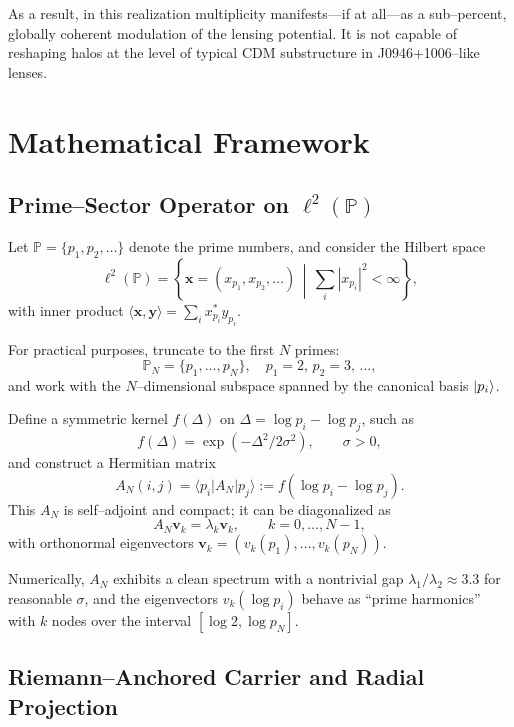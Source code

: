 \documentclass[11pt]{article}
\begin{document}
As a result, in this realization multiplicity manifests---if at all---as a sub--percent, globally coherent modulation of the lensing potential. It is not capable of reshaping halos at the level of typical CDM substructure in J0946+1006--like lenses.

\section{Mathematical Framework}

\subsection{Prime--Sector Operator on $\ell^2(\mathbb{P})$}

Let $\mathbb{P} = \{p_1, p_2, \dots\}$ denote the prime numbers, and consider the Hilbert space
\[
\ell^2(\mathbb{P}) = \left\{ \bm{x} = (x_{p_1}, x_{p_2}, \dots) \,\middle|\, \sum_{i} |x_{p_i}|^2 < \infty \right\},
\]
with inner product $\langle \bm{x}, \bm{y} \rangle = \sum_i x_{p_i}^* y_{p_i}$.

For practical purposes, truncate to the first $N$ primes:
\[
\mathbb{P}_N = \{p_1, \dots, p_N\},\quad
p_1 = 2,\,p_2=3,\,\dots,
\]
and work with the $N$--dimensional subspace spanned by the canonical basis $\ket{p_i}$.

Define a symmetric kernel $f(\Delta)$ on $\Delta = \log p_i - \log p_j$, such as
\[
f(\Delta) = \exp(-\Delta^2 / 2\sigma^2),\qquad \sigma > 0,
\]
and construct a Hermitian matrix
\begin{equation}
  A_N(i,j) = \langle p_i | A_N | p_j \rangle := f(\log p_i - \log p_j).
\end{equation}
This $A_N$ is self--adjoint and compact; it can be diagonalized as
\begin{equation}
  A_N \bm{v}_k = \lambda_k \bm{v}_k,\qquad
  k = 0,\dots,N-1,
\end{equation}
with orthonormal eigenvectors $\bm{v}_k = (v_k(p_1),\dots,v_k(p_N))$.

Numerically, $A_N$ exhibits a clean spectrum with a nontrivial gap $\lambda_1/\lambda_2 \approx 3.3$ for reasonable $\sigma$, and the eigenvectors $v_k(\log p_i)$ behave as ``prime harmonics'' with $k$ nodes over the interval $[\log 2,\log p_N]$.

\subsection{Riemann--Anchored Carrier and Radial Projection}
\end{document}
